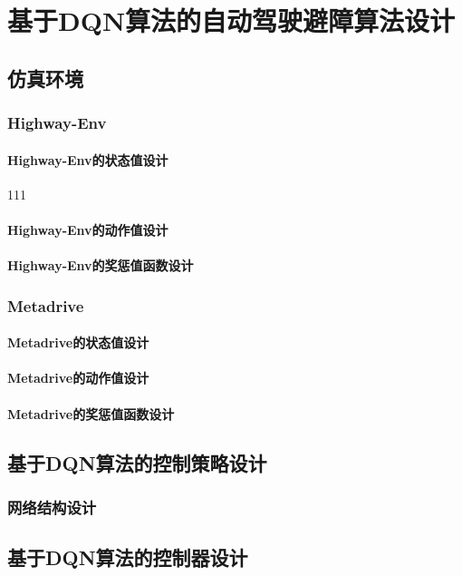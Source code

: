 %
%
%
%
%

\chapter{基于DQN算法的自动驾驶避障算法设计}

\section{仿真环境}

\subsection{Highway-Env}

\subsubsection{Highway-Env的状态值设计}
111
\subsubsection{Highway-Env的动作值设计}

\subsubsection{Highway-Env的奖惩值函数设计}

\subsection{Metadrive}

\subsubsection{Metadrive的状态值设计}

\subsubsection{Metadrive的动作值设计}

\subsubsection{Metadrive的奖惩值函数设计}


\section{基于DQN算法的控制策略设计}

\subsection{网络结构设计}


\section{基于DQN算法的控制器设计}
